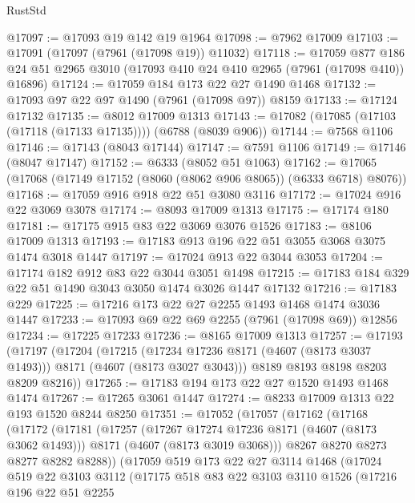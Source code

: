 \begin{lexlean}{RustStd}
\begin{coremodule}
@17097 := @17093 @19 @142 @19 @1964
@17098 := @7962 @17009
@17103 := @17091 (@17097 (@7961 (@17098 @19)) @11032)
@17118 := @17059
    @877
    @186
    @24
    @51
    @2965
    @3010
    (@17093 @410 @24 @410 @2965 (@7961 (@17098 @410)) @16896)
@17124 := @17059 @184 @173 @22 @27 @1490 @1468
@17132 := @17093 @97 @22 @97 @1490 (@7961 (@17098 @97)) @8159
@17133 := @17124 @17132
@17135 := @8012 @17009 @1313
@17143 := @17082 (@17085 (@17103 (@17118 (@17133 @17135)))) (@6788 (@8039 @906))
@17144 := @7568 @1106
@17146 := @17143 (@8043 @17144)
@17147 := @7591 @1106
@17149 := @17146 (@8047 @17147)
@17152 := @6333 (@8052 @51 @1063)
@17162 := @17065 (@17068 (@17149 @17152 (@8060 (@8062 @906 @8065)) (@6333 @6718) @8076))
@17168 := @17059 @916 @918 @22 @51 @3080 @3116
@17172 := @17024 @916 @22 @3069 @3078
@17174 := @8093 @17009 @1313
@17175 := @17174 @180
@17181 := @17175 @915 @83 @22 @3069 @3076 @1526
@17183 := @8106 @17009 @1313
@17193 := @17183 @913 @196 @22 @51 @3055 @3068 @3075 @1474 @3018 @1447
@17197 := @17024 @913 @22 @3044 @3053
@17204 := @17174 @182 @912 @83 @22 @3044 @3051 @1498
@17215 := @17183 @184 @329 @22 @51 @1490 @3043 @3050 @1474 @3026 @1447 @17132
@17216 := @17183 @229
@17225 := @17216 @173 @22 @27 @2255 @1493 @1468 @1474 @3036 @1447
@17233 := @17093 @69 @22 @69 @2255 (@7961 (@17098 @69)) @12856
@17234 := @17225 @17233
@17236 := @8165 @17009 @1313
@17257 := @17193
    (@17197
      (@17204
        (@17215 (@17234 @17236 @8171 (@4607 (@8173 @3037 @1493))) @8171 (@4607 (@8173 @3027 @3043)))
        @8189
        @8193
        @8198
        @8203
        @8209
        @8216))
@17265 := @17183 @194 @173 @22 @27 @1520 @1493 @1468 @1474
@17267 := @17265 @3061 @1447
@17274 := @8233 @17009 @1313 @22 @193 @1520 @8244 @8250
@17351 := @17052
    (@17057
      (@17162
        (@17168
          (@17172
            (@17181
              (@17257
                (@17267 @17274 @17236 @8171 (@4607 (@8173 @3062 @1493)))
                @8171
                (@4607 (@8173 @3019 @3068)))
              @8267
              @8270
              @8273
              @8277
              @8282
              @8288))
          (@17059
            @519
            @173
            @22
            @27
            @3114
            @1468
            (@17024
              @519
              @22
              @3103
              @3112
              (@17175
                @518
                @83
                @22
                @3103
                @3110
                @1526
                (@17216
                  @196
                  @22
                  @51
                  @2255

\end{coremodule}
\end{lexlean}
